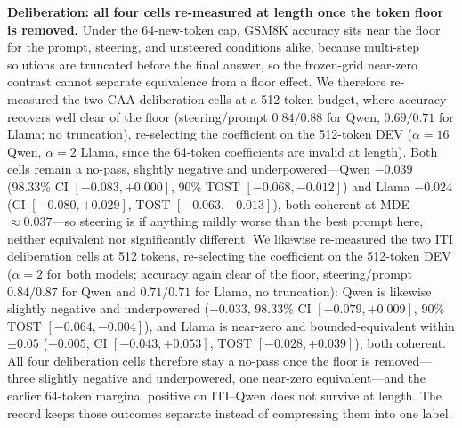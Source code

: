 \documentclass[manuscript,review,anonymous]{acmart}
\begin{document}
\textbf{Deliberation: all four cells re-measured at length once the token floor is removed.} Under the 64-new-token cap, GSM8K accuracy sits near the floor for the prompt, steering, and unsteered conditions alike, because multi-step solutions are truncated before the final answer, so the frozen-grid near-zero contrast cannot separate equivalence from a floor effect. We therefore re-measured the two CAA deliberation cells at a 512-token budget, where accuracy recovers well clear of the floor (steering/prompt \(0.84/0.88\) for Qwen, \(0.69/0.71\) for Llama; no truncation), re-selecting the coefficient on the 512-token DEV (\(\alpha=16\) Qwen, \(\alpha=2\) Llama, since the 64-token coefficients are invalid at length). Both cells remain a no-pass, slightly negative and underpowered---Qwen \(-0.039\) (98.33\% CI \([-0.083,+0.000]\), 90\% TOST \([-0.068,-0.012]\)) and Llama \(-0.024\) (CI \([-0.080,+0.029]\), TOST \([-0.063,+0.013]\)), both coherent at MDE \(\approx0.037\)---so steering is if anything mildly worse than the best prompt here, neither equivalent nor significantly different. We likewise re-measured the two ITI deliberation cells at 512 tokens, re-selecting the coefficient on the 512-token DEV (\(\alpha=2\) for both models; accuracy again clear of the floor, steering/prompt \(0.84/0.87\) for Qwen and \(0.71/0.71\) for Llama, no truncation): Qwen is likewise slightly negative and underpowered (\(-0.033\), 98.33\% CI \([-0.079,+0.009]\), 90\% TOST \([-0.064,-0.004]\)), and Llama is near-zero and bounded-equivalent within \(\pm0.05\) (\(+0.005\), CI \([-0.043,+0.053]\), TOST \([-0.028,+0.039]\)), both coherent. All four deliberation cells therefore stay a no-pass once the floor is removed---three slightly negative and underpowered, one near-zero equivalent---and the earlier 64-token marginal positive on ITI--Qwen does not survive at length. {}%
{}%
{}%
{}%
The record keeps those outcomes separate instead of compressing them into one label.
\end{document}
